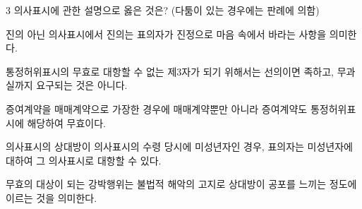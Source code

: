 \begin{question}{3}
의사표시에 관한 설명으로 옳은 것은? (다툼이 있는 경우에는 판례에 의함)
\begin{choices}
  \item 진의 아닌 의사표시에서 진의는 표의자가 진정으로 마음 속에서 바라는 사항을 의미한다.
  \item 통정허위표시의 무효로 대항할 수 없는 제3자가 되기 위해서는 선의이면 족하고, 무과실까지 요구되는 것은 아니다.
  \item 증여계약을 매매계약으로 가장한 경우에 매매계약뿐만 아니라 증여계약도 통정허위표시에 해당하여 무효이다.
  \item 의사표시의 상대방이 의사표시의 수령 당시에 미성년자인 경우, 표의자는 미성년자에 대하여 그 의사표시로 대항할 수 있다.
  \item 무효의 대상이 되는 강박행위는 불법적 해악의 고지로 상대방이 공포를 느끼는 정도에 이르는 것을 의미한다.
\end{choices}
\end{question}
